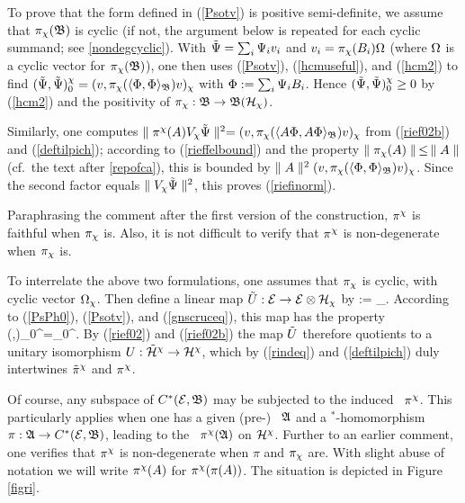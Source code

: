 To prove that the form defined in (\ref{Psotv}) is positive
semi-definite, we assume that $\pi_{\chi}({\frak B})$ is cyclic (if not, the
argument below is repeated for each cyclic summand; see
\ref{nondegcyclic}).  With $\tilde{\Psi}=\sum_i\Psi_i v_i$ and
$v_i=\pi_{\chi}(B_i)\Omega$ (where $\Omega$ is a cyclic vector for $\pi_{\chi}({\frak B})$),
one then uses (\ref{Psotv}), (\ref{hcmuseful}), and (\ref{hcm2}) to
find $(\tilde{\Psi},\tilde{\Psi})_0^{\chi}=(v,\pi_{\chi}(\langle \Phi,\Phi\rangle_{\frak B})v)_{\chi}$
with $\Phi:=\sum_i \Psi_i B_i$. Hence $(\tilde{\Psi},\tilde{\Psi})_0^{\chi}\geq
0$ by (\ref{hcm2}) and the positivity of $\pi_{\chi}:{\frak B}\rightarrow{\frak B}({\cal H}_{\chi})$.

Similarly, one computes $\parallel \pi^{\chi}(A)V_{\chi}\tilde{\Psi}\parallel^2=(v,\pi_{\chi}(\langle
A\Phi,A\Phi\rangle_{\frak B})v)_{\chi}$ from (\ref{rief02b}) and (\ref{deftilpich});
according to (\ref{rieffelbound}) and the property
$\parallel\pi_{\chi}(A)\parallel\,\leq\,\parallel A\parallel$ (cf.\ the text after \ref{repofca}),
this is bounded by $\parallel A\parallel^2 (v,\pi_{\chi}(\langle \Phi,\Phi\rangle_{\frak B})v)_{\chi}$.  Since
the second factor equals $\parallel V_{\chi}\tilde{\Psi}\parallel^2$, this proves
(\ref{riefinorm}).\enp

 Paraphrasing the comment after the first version of the construction,
 $\pi^{\chi}$ is faithful when $\pi_{\chi}$ is.  Also, it is not difficult to
 verify that $\pi^{\chi}$ is non-degenerate when $\pi_{\chi}$ is.

To interrelate the above two formulations, one assumes that
$\pi_{\chi}$ is cyclic, with cyclic vector $\Omega_{\chi}$. Then define a
linear map $\tilde{U}:{\cal E}\rightarrow{\cal E}\otimes{\cal H}_{\chi}$ by \be {}\Ps:=\Ps\ot
\Om_{\ch}.  \ee According to (\ref{PsPh0}), (\ref{Psotv}), and
(\ref{gnscruceq}), this map has the property \be
(\Ps,\Ph)_0^{\ch}=\wt{(\til{\Ps},\til{\Ph})}_0^{\ch}. 
\ee By (\ref{rief02}) and (\ref{rief02b}) the map $\tilde{U}$ therefore
quotients to a unitary isomorphism $U:\tilde{{\cal H}}^{\chi}\rightarrow{\cal H}^{\chi}$, which
by (\ref{rindeq}) and (\ref{deftilpich}) duly intertwines
$\tilde{\pi}^{\chi}$ and $\pi^{\chi}$.

Of course, any subspace of $C^*({\cal E},{\frak B})$ may be subjected to the
induced \rep\ $\pi^{\chi}$. This particularly applies when one has a given
(pre-) \ca\ ${\frak A}$ and a $\mbox{}^*$-homomorphism $\pi:{\frak A}\rightarrow
C^*({\cal E},{\frak B})$, leading to the \rep\ $\pi^{\chi}({\frak A})$ on ${\cal H}^{\chi}$. Further to an
earlier comment, one verifies that $\pi^{\chi}$ is non-degenerate when $\pi$
and $\pi_{\chi}$ are.  With slight abuse of notation we will write $\pi^{\chi}(A)$
for $\pi^{\chi}(\pi(A))$.  The situation is depicted in Figure \ref{figri}.

